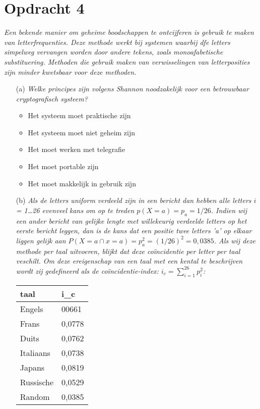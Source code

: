 \section{Opdracht 4}
\emph{Een bekende manier om geheime boodschappen te ontcijferen is gebruik te maken van letterfrequenties. Deze methode werkt bij systemen waarbij dfe letters simpelweg vervangen worden door andere tekens, zoals monoafabetische substituering. Methoden die gebruik maken van verwisselingen van letterposities zijn minder kwetsbaar voor deze methoden.}

\begin{itemize}
\item[(a)] \emph{Welke principes zijn volgens Shannon noodzakelijk voor een betrouwbaar cryptografisch systeem?}\\
\begin{itemize}
  \item Het systeem moet praktische zijn
  \item Het systeem moet niet geheim zijn
  \item Het moet werken met telegrafie
  \item Het moet portable zijn
  \item Het moet makkelijk in gebruik zijn
\end{itemize}
  
\item[(b)] \emph{Als de letters uniform verdeeld zijn in een bericht dan hebben alle letters $i$ = 1\ldots26 evenveel kans om op te treden $p(X=a)=p_a=1/26$. Indien wij een ander bericht van gelijke lengte met willekeurig verdeelde letters op het eerste bericht leggen, dan is de kans dat een positie twee letters 'a' op elkaar liggen gelijk aan $P(X=a\cap x = a)=p_a^2=(1/26)^2=0,0385$. Als wij deze methode per taal uitvoeren, blijkt dat deze co\"{i}ncidentie per letter per taal veschilt. Om deze ereigenschap van een taal met een kental te beschrijven wordt zij gedefineerd als de \emph{co\"{i}ncidentie-index}: $i_c=\sum ^{26}_{i=1} p^2_i$:}

\begin{center}
\begin{tabular}{ll}
  taal & i_c \\
  \hline
  Engels & 00661 \\ 
  Frans & 0,0778 \\
  Duits & 0,0762 \\
  Italiaans & 0,0738 \\
  Japans & 0,0819 \\
  Russische & 0,0529 \\
  Random & 0,0385 \\
\end{tabular}
\end{center}


\end{itemize}
